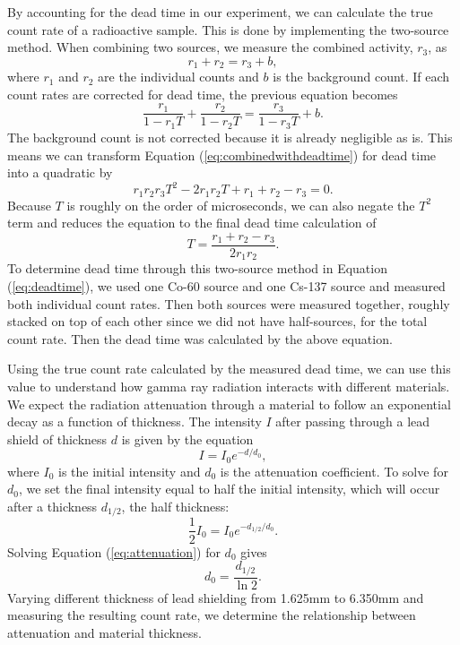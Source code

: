 \par By accounting for the dead time in our experiment, we can calculate the true count rate of a radioactive sample. This is done by implementing the two-source method. When combining two sources, we measure the combined activity, $r_3$, as\cite{Spectrum}
\begin{equation}
r_1 + r_2 = r_3 + b,
\label{eq:combinedcountrate}
\end{equation}
where $r_1$ and $r_2$ are the individual counts and $b$ is the background count. If each count rates are corrected for dead time, the previous equation becomes
\begin{equation}
\frac{r_1}{1-r_1 T} + \frac{r_2}{1-r_2 T} = \frac{r_3}{1-r_3 T} + b.
\label{eq:combinedwithdeadtime}
\end{equation}
The background count is not corrected because it is already negligible as is. This means we can transform Equation (\ref{eq:combinedwithdeadtime}) for dead time into a quadratic by
\begin{equation}
r_1 r_2 r_3 T^2 - 2r_1 r_2 T + r_1 + r_2 - r_3 = 0.
\label{eq:quaddeadtime}
\end{equation}
Because $T$ is roughly on the order of microseconds, we can also negate the $T^2$ term and reduces the equation to the final dead time calculation of 
\begin{equation}
T = \frac{r_1 + r_2 - r_3}{2r_1 r_2}.
\label{eq:deadtime}
\end{equation}
To determine dead time through this two-source method in Equation (\ref{eq:deadtime}), we used one Co-60 source and one Cs-137 source and measured both individual count rates. Then both sources were measured together, roughly stacked on top of each other since we did not have half-sources, for the total count rate. Then the dead time was calculated by the above equation.

\par Using the true count rate calculated by the measured dead time, we can use this value to understand how gamma ray radiation interacts with different materials. We expect the radiation attenuation through a material to follow an exponential decay as a function of thickness. The intensity $I$ after passing through a lead shield of thickness $d$ is given by the equation\cite{Knoll}
\begin{equation}
I = I_0e^{-d/d_0},
\end{equation}
where $I_0$ is the initial intensity and $d_0$ is the attenuation coefficient. To solve for $d_0$, we set the final intensity equal to half the initial intensity, which will occur after a thickness $d_{1/2}$, the half thickness:
\begin{equation}
\frac{1}{2} I_0 = I_0e^{-d_{1/2}/d_0}.
\label{eq:attenuation}
\end{equation}
Solving Equation (\ref{eq:attenuation}) for $d_0$ gives
\begin{equation}
d_0 = \frac{d_{1/2}}{\ln{2}}.
\end{equation}
Varying different thickness of lead shielding from 1.625mm to 6.350mm and measuring the resulting count rate, we determine the relationship between attenuation and material thickness.


